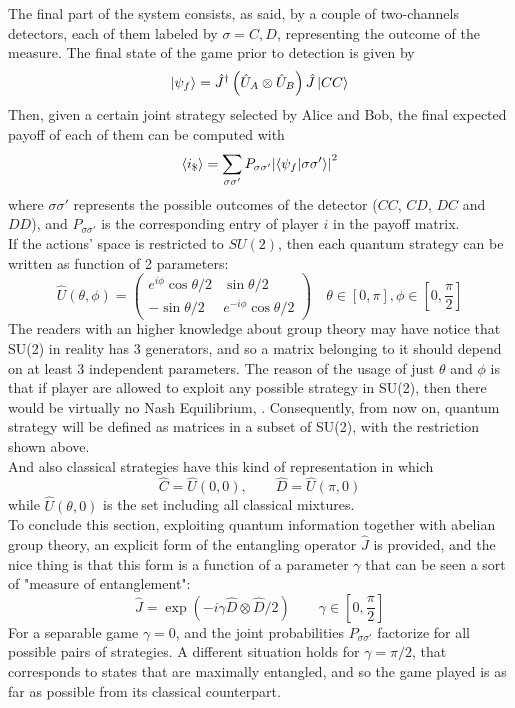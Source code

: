 The final part of the system consists, as said, by a couple of two-channels detectors, each of them labeled by $\sigma=C,D$, representing the outcome of the measure. The final state of the game prior to detection is given by
\[ \ket{\psi_f} = \hat{J}^\dagger\left(\hat{U}_A\otimes\hat{U}_B\right)\hat{J}\ket{CC} \]
Then, given a certain joint strategy selected by Alice and Bob, the final expected payoff of each of them can be computed with
\[ \expval{i_\$} = \sum_{\sigma\sigma'} P_{\sigma\sigma'}\abs{\bra{\psi_f}\ket{\sigma\sigma'}}^2 \]
where $\sigma\sigma'$ represents the possible outcomes of the detector ($CC$, $CD$, $DC$ and $DD$), and $P_{\sigma\sigma'}$ is the corresponding entry of player $i$ in the payoff matrix.\\
If the actions' space is restricted to $SU(2)$, then each quantum strategy can be written as function of 2 parameters:
\[ \hat{U}(\theta,\phi) = \begin{pmatrix}
e^{i\phi}\cos\theta/2 & \sin\theta/2 \\ -\sin\theta/2 & e^{-i\phi}\cos\theta/2
\end{pmatrix} \quad \theta\in[0,\pi], \phi\in[0,\frac{\pi}{2}] \]
The readers with an higher knowledge about group theory may have notice that SU(2) in reality has 3 generators, and so a matrix belonging to it should depend on at least 3 independent parameters. The reason of the usage of just $\theta$ and $\phi$ is that if player are allowed to exploit any possible strategy in SU(2), then there would be virtually no Nash Equilibrium, \cite{Du_2000}. Consequently, from now on, quantum strategy will be defined as matrices in a subset of SU(2), with the restriction shown above.\\
And also classical strategies have this kind of representation in which
\[ \hat{C} = \hat{U}(0,0), \qquad \hat{D} = \hat{U}(\pi,0) \]
while $\hat{U}(\theta,0)$ is the set including all classical mixtures.\\
To conclude this section, exploiting quantum information together with abelian group theory, an explicit form of the entangling operator $\hat{J}$ is provided, and the nice thing is that this form is a function of a parameter $\gamma$ that can be seen a sort of "measure of entanglement":
\[ \hat{J} = \exp\left(-i\gamma\hat{D}\otimes\hat{D}/2\right) \qquad \gamma\in[0,\frac{\pi}{2}] \]
For a separable game $\gamma=0$, and the joint probabilities $P_{\sigma\sigma'}$ factorize for all possible pairs of strategies. A different situation holds for $\gamma = \pi/2$, that corresponds to states that are maximally entangled, and so the game played is as far as possible from its classical counterpart. 






